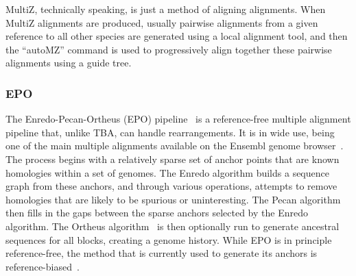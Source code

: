 \documentclass[fleqn,10pt]{wlscirep}
\begin{document}
MultiZ, technically speaking, is just a method of aligning alignments.
When MultiZ alignments are produced, usually pairwise alignments from a given reference to all other species are generated using a local alignment tool, and then the ``autoMZ'' command is used to progressively align together these pairwise alignments using a guide tree.
\subsubsection{EPO}
The Enredo-Pecan-Ortheus (EPO) pipeline~\cite{epo, ortheus} is a reference-free multiple alignment pipeline that, unlike TBA, can handle rearrangements.
It is in wide use, being one of the main multiple alignments available on the Ensembl genome browser~\cite{Aken01012016}.
The process begins with a relatively sparse set of anchor points that are known homologies within a set of genomes.
The Enredo algorithm builds a sequence graph from these anchors, and through various operations, attempts to remove homologies that are likely to be spurious or uninteresting.
The Pecan algorithm then fills in the gaps between the sparse anchors selected by the Enredo algorithm.
The Ortheus algorithm~\cite{ortheus} is then optionally run to generate ancestral sequences for all blocks, creating a genome history.
While EPO is in principle reference-free, the method that is currently used to generate its anchors is reference-biased~\cite{epo}.
\end{document}

